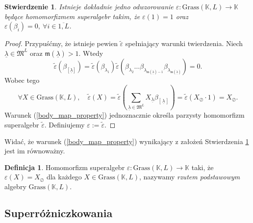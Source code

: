 \documentclass[11pt,a4paper]{report}
\newtheorem{proposition}[theorem]{Stwierdzenie}
\theoremstyle{definition}
\newtheorem{definition}[theorem]{Definicja}
\begin{document}
\begin{proposition}
	\label{body_map_proposition}
	Istnieje dokładnie jedno odwzorowanie $\varepsilon: \mathrm{Grass}(\mathbb{K},L) \rightarrow \mathbb{K}$ będące homomorfizmem superalgebr takim, że $\varepsilon(1) = 1$ oraz $\varepsilon \! \left(\beta_{i} \right) = 0, \ \forall i \in \overline{1,L}$.
\end{proposition}

\begin{proof}
	Przypuśćmy, że istnieje pewien $\tilde{\varepsilon}$ spełniający warunki twierdzenia. Niech $\underline{\lambda} \in \mathfrak{M}^{L}$ oraz $\mathfrak{m}\! \left( \underline{\lambda} \right)>1$. Wtedy
	\begin{equation*}
		\tilde{\varepsilon}\left(\beta_{[\underline{\lambda}]} \right) = \tilde{\varepsilon}\left(\beta_{\lambda_1} \right) \tilde{\varepsilon} \left( \beta_{\lambda_2} \ldots \beta_{\lambda_{\mathfrak{m} \! \left( \underline{\lambda} \right)-1}} \beta_{\lambda_{\mathfrak{m} \!\left(\underline{\lambda}\right)}}\right) = 0.
	\end{equation*}
	Wobec tego
	\begin{equation}
		\label{body_map_property}
		\forall X \in \mathrm{Grass}(\mathbb{K},L), \quad \tilde{\varepsilon}(X) = \tilde{\varepsilon} \left( \sum_{\underline{\lambda} \in \mathfrak{M}^L} X_{\underline{\lambda}} \beta_{\left[\, \underline{\lambda}\, \right]} \right) = \tilde{\varepsilon}(X_{\oslash} \cdot 1) = X_{\oslash}.
	\end{equation}
	Warunek (\ref{body_map_property}) jednoznacznie określa parzysty homomorfizm superalgebr $\tilde{\varepsilon}$. Definiujemy $\varepsilon := \tilde{\varepsilon}$.
\end{proof}

Widać, że warunek (\ref{body_map_property}) wynikający z założeń Stwierdzenia \ref{body_map_proposition} jest im równoważny.

\begin{definition}
	Homomorfizm superalgebr $\varepsilon: \mathrm{Grass}(\mathbb{K},L) \rightarrow \mathbb{K}$ taki, że  $\varepsilon (X) = X_{\oslash}$ dla każdego $X \in \mathrm{Grass}(\mathbb{K},L)$, nazywamy \textit{rzutem podstawowym} algebry $\mathrm{Grass}(\mathbb{K},L)$.
\end{definition}

\subsection{Superróżniczkowania}
\end{document}
